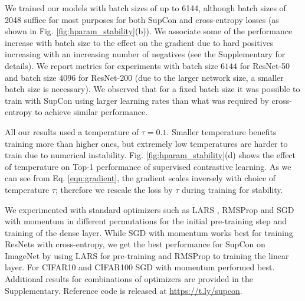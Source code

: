 We trained our models with batch sizes of up to 6144, although batch sizes of 2048 suffice for most purposes for both SupCon and cross-entropy losses (as shown in Fig. \ref{fig:hparam_stability}(b)). We associate some of the performance increase with batch size to the effect on the gradient due to hard positives increasing with an increasing number of negatives (see the Supplementary for details). We report metrics for experiments with batch size $6144$ for ResNet-50 and batch size $4096$ for ResNet-200 (due to the larger network size, a smaller batch size is necessary). We observed that for a fixed batch size it was possible to train with SupCon using larger learning rates than what was required by cross-entropy to achieve similar performance.

All our results used a temperature of $\tau = 0.1$. Smaller temperature benefits training more than higher ones, but extremely low temperatures are harder to train due to numerical instability. Fig. \ref{fig:hparam_stability}(d) shows the effect of temperature on Top-1 performance of supervised contrastive learning. As we can see from Eq. \ref{eqn:gradient}, the gradient scales inversely with choice of temperature $\tau$; therefore we rescale the loss by $\tau$ during training for stability.

We experimented with standard optimizers such as LARS \cite{you2017large}, RMSProp \cite{hinton2012neural} and SGD with momentum \cite{ruder2016overview} in different permutations for the initial pre-training step and training of the dense layer. While SGD with momentum works best for training ResNets with cross-entropy, we get the best performance for SupCon on ImageNet by using LARS for pre-training and RMSProp to training the linear layer. For CIFAR10 and CIFAR100 SGD with momentum performed best. Additional results for combinations of optimizers are provided in the Supplementary. Reference code is released at \url{https://t.ly/supcon}. 